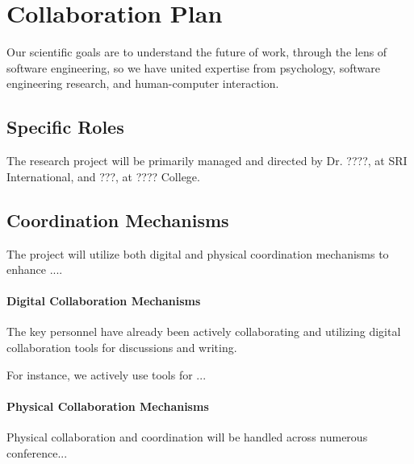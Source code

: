 

\section*{Collaboration Plan} %
\label{sec:collaborationPlan}

Our scientific goals are to understand the future of work, through the
lens of software engineering, so we have united expertise from psychology, software
engineering research, and human-computer interaction.

\subsection*{Specific Roles}
The research project will be primarily managed and directed by Dr. ????, at SRI
International, and ???, at ???? College.

\subsection*{Coordination Mechanisms}
The project will utilize both digital and physical coordination mechanisms to enhance ....

\paragraph{Digital Collaboration Mechanisms}

The key personnel have already been actively collaborating and utilizing digital
collaboration tools for discussions and writing.

For instance, we actively use tools for ...

\paragraph{Physical Collaboration Mechanisms}
Physical collaboration and coordination will be handled across numerous conference...

